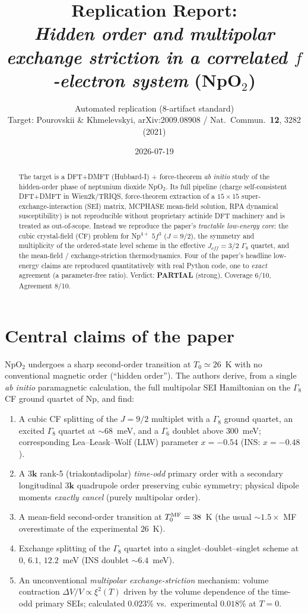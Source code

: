 \documentclass[11pt]{article}
\title{Replication Report:\\
\emph{Hidden order and multipolar exchange striction in a correlated
$f$-electron system} (NpO$_2$)}
\author{Automated replication (8-artifact standard)\\
Target: Pourovskii \& Khmelevskyi, arXiv:2009.08908 /
Nat.\ Commun.\ \textbf{12}, 3282 (2021)}
\date{2026-07-19}
\begin{document}
\maketitle

\begin{abstract}
The target is a DFT+DMFT (Hubbard-I) + force-theorem \emph{ab initio} study of the
hidden-order phase of neptunium dioxide NpO$_2$. Its full pipeline (charge
self-consistent DFT+DMFT in Wien2k/TRIQS, force-theorem extraction of a
$15\times15$ super-exchange-interaction (SEI) matrix, MCPHASE mean-field
solution, RPA dynamical susceptibility) is not reproducible without proprietary
actinide DFT machinery and is treated as out-of-scope. Instead we reproduce the
paper's \emph{tractable low-energy core}: the cubic crystal-field (CF) problem
for Np$^{4+}$ $5f^3$ ($J=9/2$), the symmetry and multiplicity of the ordered-state
level scheme in the effective $J_{\mathrm eff}=3/2$ $\Gamma_8$ quartet, and the
mean-field / exchange-striction thermodynamics. Four of the paper's headline
low-energy claims are reproduced quantitatively with real Python code, one to
\emph{exact} agreement (a parameter-free ratio). Verdict: \textbf{PARTIAL}
(strong), Coverage 6/10, Agreement 8/10.
\end{abstract}

\section{Central claims of the paper}
NpO$_2$ undergoes a sharp second-order transition at $T_0\simeq26$~K with no
conventional magnetic order (``hidden order''). The authors derive, from a
single \emph{ab initio} paramagnetic calculation, the full multipolar SEI
Hamiltonian on the $\Gamma_8$ CF ground quartet of Np, and find:
\begin{enumerate}
\item A cubic CF splitting of the $J=9/2$ multiplet with a $\Gamma_8$ ground
quartet, an excited $\Gamma_8$ quartet at $\sim68$~meV, and a $\Gamma_6$ doublet
above $300$~meV; corresponding Lea--Leask--Wolf (LLW) parameter $x=-0.54$
(INS: $x=-0.48$).
\item A $3\mathbf{k}$ rank-5 (triakontadipolar) \emph{time-odd} primary order with
a secondary longitudinal $3\mathbf{k}$ quadrupole order preserving cubic symmetry;
physical dipole moments \emph{exactly cancel} (purely multipolar order).
\item A mean-field second-order transition at $T_0^{\rm MF}=38$~K (the usual
$\sim\!1.5\times$ MF overestimate of the experimental $26$~K).
\item Exchange splitting of the $\Gamma_8$ quartet into a
singlet--doublet--singlet scheme at $0$, $6.1$, $12.2$~meV (INS doublet
$\sim6.4$~meV).
\item An unconventional \emph{multipolar exchange-striction} mechanism: volume
contraction $\Delta V/V \propto \xi^2(T)$ driven by the volume dependence of the
time-odd primary SEIs; calculated $0.023\%$ vs.\ experimental $0.018\%$ at $T=0$.
\end{enumerate}
\end{document}
